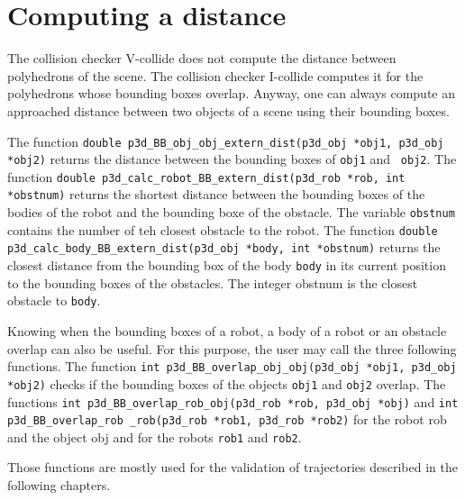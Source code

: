 \section{Computing a distance}


The collision checker V-collide does not compute the distance between
polyhedrons of the scene. The collision checker I-collide computes it
for the polyhedrons whose bounding boxes overlap. Anyway, one can
always compute an approached distance between two objects of a scene
using their bounding boxes.

The function {\tt double p3d\_BB\_obj\_obj\_extern\_dist(p3d\_obj
*obj1, p3d\_obj *obj2)} 
returns the distance between the bounding boxes of {\tt obj1} and {\tt
obj2}. The function {\tt double
p3d\_calc\_robot\_BB\_extern\_dist(p3d\_rob *rob, int *obstnum)}
 returns the shortest
distance between the bounding boxes of the bodies of the robot and the
bounding boxe of the obstacle. The variable {\tt obstnum} contains the
number of teh closest obstacle to the robot. The function {\tt double
p3d\_calc\_body\_BB\_extern\_dist(p3d\_obj *body, int *obstnum)}
 returns the closest distance
from the bounding box of the body {\tt body} in its current position
to the bounding boxes of the obstacles. The integer obstnum is the
closest obstacle to {\tt body}.


Knowing when the bounding boxes of a robot, a body of a robot or an
obstacle overlap can also be useful. For this purpose, the user may
call the three following functions. The function {\tt int
p3d\_BB\_overlap\_obj\_obj(p3d\_obj *obj1, p3d\_obj *obj2)}
 checks if
the bounding boxes of the objects {\tt obj1} and {\tt obj2}
overlap. The functions {\tt int p3d\_BB\_overlap\_rob\_obj(p3d\_rob
*rob, p3d\_obj *obj)}  and {\tt int
p3d\_BB\_overlap\_rob \_rob(p3d\_rob *rob1, p3d\_rob *rob2)}
 for the robot {rob} and the object
{obj} and for the robots {\tt rob1} and {\tt rob2}.

Those functions are mostly used for the validation of trajectories
described in the following chapters.
